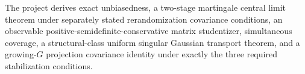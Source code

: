 The project derives exact unbiasedness, a two-stage martingale central limit theorem under separately stated rerandomization covariance conditions, an observable positive-semidefinite-conservative matrix studentizer, simultaneous coverage, a structural-class uniform singular Gaussian transport theorem, and a growing-\(G\) projection covariance identity under exactly the three required stabilization conditions.